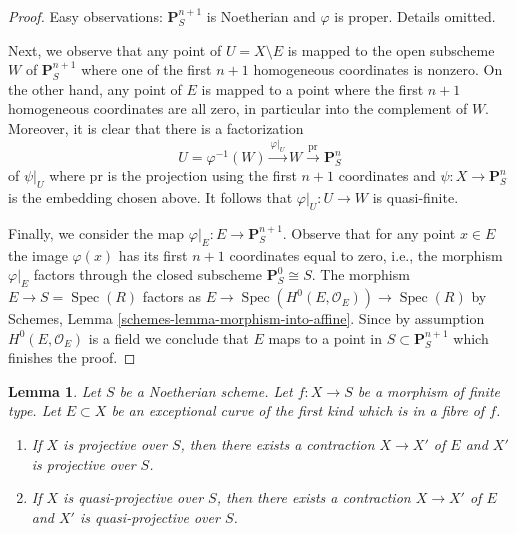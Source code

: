 \documentclass{stacks-project}
\theoremstyle{plain}
\newtheorem{lemma}[subsection]{Lemma}
\theoremstyle{definition}
\theoremstyle{remark}
\numberwithin{equation}{subsection}
\def\Spec{\mathop{\mathrm{Spec}}}
\begin{document}
\begin{proof}
\medskip\noindent
Easy observations: $\mathbf{P}^{n + 1}_S$ is Noetherian and $\varphi$ is proper.
Details omitted.

\medskip\noindent
Next, we observe that any point of $U = X \setminus E$ is mapped
to the open subscheme $W$ of $\mathbf{P}^{n + 1}_S$ where one of the
first $n + 1$ homogeneous coordinates is nonzero. On the other hand,
any point of $E$ is mapped to a point where the first $n + 1$ homogeneous
coordinates are all zero, in particular into the complement of $W$.
Moreover, it is clear that there is a factorization
$$
U = \varphi^{-1}(W) \xrightarrow{\varphi|_U}
W \xrightarrow{\text{pr}} \mathbf{P}^n_S
$$
of $\psi|_U$ where $\text{pr}$ is the projection using the first
$n + 1$ coordinates and $\psi : X \to \mathbf{P}^n_S$ is the embedding chosen
above. It follows that $\varphi|_U : U \to W$ is quasi-finite.

\medskip\noindent
Finally, we consider the map $\varphi|_E : E \to \mathbf{P}^{n + 1}_S$.
Observe that for any point $x \in E$ the image $\varphi(x)$
has its first $n + 1$ coordinates equal to zero, i.e., the morphism
$\varphi|_E$ factors through the closed subscheme
$\mathbf{P}^0_S \cong S$. The morphism $E \to S = \Spec(R)$
factors as $E \to \Spec(H^0(E, \mathcal{O}_E)) \to \Spec(R)$
by Schemes, Lemma \ref{schemes-lemma-morphism-into-affine}.
Since by assumption $H^0(E, \mathcal{O}_E)$ is a field we conclude
that $E$ maps to a point in $S \subset \mathbf{P}^{n + 1}_S$
which finishes the proof.
\end{proof}

\begin{lemma}
\label{lemma-contract-when-quasi-projective}
Let $S$ be a Noetherian scheme. Let $f : X \to S$ be a morphism of finite type.
Let $E \subset X$ be an exceptional curve of the first kind which is in a
fibre of $f$.
\begin{enumerate}
\item If $X$ is projective over $S$, then there exists a contraction
$X \to X'$ of $E$ and $X'$ is projective over $S$.
\item If $X$ is quasi-projective over $S$, then there exists a contraction
$X \to X'$ of $E$ and $X'$ is quasi-projective over $S$.
\end{enumerate}
\end{lemma}
\end{document}

